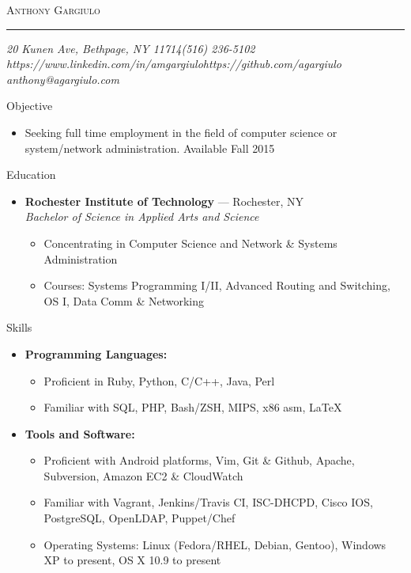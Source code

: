 \documentclass[10pt,oneside]{article}
\makeatletter
\newcommand{\name}{Anthony Gargiulo}
\newcommand{\addr}{20 Kunen Ave, Bethpage, NY 11714}
\newcommand{\mobilePhone}{(516) 236-5102}
\newcommand{\email}{anthony@agargiulo.com}
\newcommand{\github}{https://github.com/agargiulo}
\newcommand{\linkedin}{https://www.linkedin.com/in/amgargiulo}
\newcommand{\bigname}[1]{
	\begin{center}\fontfamily{ppl}\selectfont\Huge\scshape#1\end{center}
}
\newenvironment{ressection}[1]{
	\vspace{3pt}
	{\fontfamily{ppl}\selectfont\Large#1}
	\begin{itemize}
	\vspace{2pt}
}{
	\end{itemize}
}
\newcommand{\resitem}[1]{
	\vspace{-2pt}
	\item \begin{flushleft} #1 \end{flushleft}
}
\newcommand{\ressubitem}[1]{
	\vspace{-1pt}
	\item \begin{flushleft} #1 \end{flushleft}
}
\newcommand{\resbigitem}[3]{
	\vspace{-3pt}
	\item
	\textbf{#1} --- #2 \\
	\textit{#3}
}
\newenvironment{ressubsec}[3]{
	\resbigitem{#1}{#2}{#3}
	\vspace{-1pt}
	\begin{itemize}
}{
	\end{itemize}
}
\newenvironment{reslist}[1]{
	\resitem{\textbf{#1}}
	\vspace{-3pt}
	\begin{itemize}
}{
	\end{itemize}
}
\makeatother
\begin{document}
 \selectfont

\bigname{\name}

\vspace{-4pt} \rule{\textwidth}{1pt}

\vspace{-1pt} {\normalsize\itshape \addr \hfill \mobilePhone \\ \linkedin \hfill \github \\ \email}

\vspace{15 pt}



\begin{ressection}{Objective}

	\ressubitem{Seeking full time employment in the field of computer science or system/network administration. Available Fall 2015}

\end{ressection}


\begin{ressection}{Education}

	\begin{ressubsec}{Rochester Institute of Technology}{Rochester, NY}{Bachelor of Science in Applied Arts and Science}
		\ressubitem{Concentrating in Computer Science and Network \& Systems Administration}
		\ressubitem{Courses: Systems Programming I/II, Advanced Routing and Switching, OS I, Data Comm \& Networking}
	\end{ressubsec}

\end{ressection}


\begin{ressection}{Skills}


	\begin{reslist}{Programming Languages:}
		\ressubitem{Proficient in Ruby, Python, C/C++, Java, Perl}
		\ressubitem{Familiar with SQL, PHP, Bash/ZSH, MIPS, x86 asm, \LaTeX}
	\end{reslist}

	\begin{reslist}{Tools and Software:}
		\ressubitem{Proficient with Android platforms, Vim, Git \& Github, Apache, Subversion, Amazon EC2 \& CloudWatch}
		\ressubitem{Familiar with Vagrant, Jenkins/Travis CI, ISC-DHCPD, Cisco IOS, PostgreSQL, OpenLDAP, Puppet/Chef}
		\ressubitem{Operating Systems: Linux (Fedora/RHEL, Debian, Gentoo), Windows XP to present, OS X 10.9 to present}
	\end{reslist}

\end{ressection}
\end{document}
